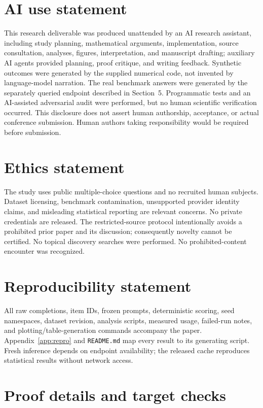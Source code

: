 \documentclass{article}
\begin{document}
\section*{AI use statement}
This research deliverable was produced unattended by an AI research assistant, including study planning, mathematical arguments, implementation, source consultation, analyses, figures, interpretation, and manuscript drafting; auxiliary AI agents provided planning, proof critique, and writing feedback. Synthetic outcomes were generated by the supplied numerical code, not invented by language-model narration. The real benchmark answers were generated by the separately queried endpoint described in Section~5. Programmatic tests and an AI-assisted adversarial audit were performed, but no human scientific verification occurred. This disclosure does not assert human authorship, acceptance, or actual conference submission. Human authors taking responsibility would be required before submission.

\section*{Ethics statement}
The study uses public multiple-choice questions and no recruited human subjects. Dataset licensing, benchmark contamination, unsupported provider identity claims, and misleading statistical reporting are relevant concerns. No private credentials are released. The restricted-source protocol intentionally avoids a prohibited prior paper and its discussion; consequently novelty cannot be certified. No topical discovery searches were performed. No prohibited-content encounter was recognized.

\section*{Reproducibility statement}
All raw completions, item IDs, frozen prompts, deterministic scoring, seed namespaces, dataset revision, analysis scripts, measured usage, failed-run notes, and plotting/table-generation commands accompany the paper. Appendix~\ref{app:repro} and \texttt{README.md} map every result to its generating script. Fresh inference depends on endpoint availability; the released cache reproduces statistical results without network access.



\clearpage
\appendix
\section{Proof details and target checks}\label{app:proofs}
\end{document}
